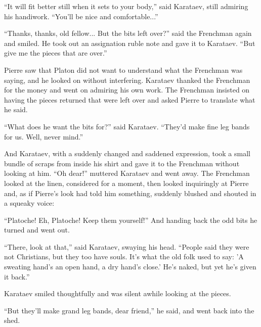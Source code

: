 ``It will fit better still when it sets to your body,'' said
Karataev, still admiring his handiwork. ``You'll be nice and
comfortable...''

``Thanks, thanks, old fellow... But the bits left over?'' said
the Frenchman again and smiled. He took out an assignation ruble
note and gave it to Karataev. ``But give me the pieces that are
over.''

Pierre saw that Platon did not want to understand what the
Frenchman was saying, and he looked on without
interfering. Karataev thanked the Frenchman for the money and
went on admiring his own work. The Frenchman insisted on having
the pieces returned that were left over and asked Pierre to
translate what he said.

``What does he want the bits for?'' said Karataev. ``They'd make
fine leg bands for us. Well, never mind.''

And Karataev, with a suddenly changed and saddened expression,
took a small bundle of scraps from inside his shirt and gave it
to the Frenchman without looking at him. ``Oh dear!'' muttered
Karataev and went away. The Frenchman looked at the linen,
considered for a moment, then looked inquiringly at Pierre and,
as if Pierre's look had told him something, suddenly blushed and
shouted in a squeaky voice:

``Platoche! Eh, Platoche! Keep them yourself!'' And handing back
the odd bits he turned and went out.

``There, look at that,'' said Karataev, swaying his
head. ``People said they were not Christians, but they too have
souls. It's what the old folk used to say: 'A sweating hand's an
open hand, a dry hand's close.'  He's naked, but yet he's given
it back.''

Karataev smiled thoughtfully and was silent awhile looking at the
pieces.

``But they'll make grand leg bands, dear friend,'' he said, and
went back into the shed.


